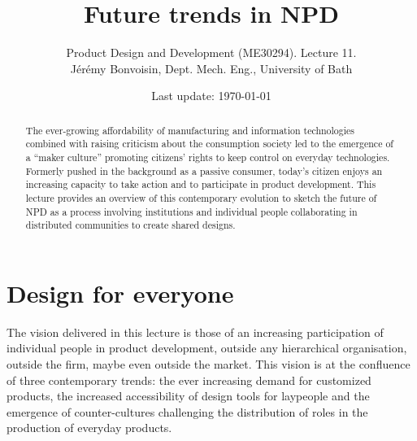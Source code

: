 \documentclass{article}
\begin{document}
\title{Future trends in NPD}

\author{Product Design and Development (ME30294). Lecture 11. \\ Jérémy Bonvoisin, Dept. Mech. Eng., University of Bath}
\date{Last update: \today}

\maketitle

\begin{abstract}
The ever-growing affordability of manufacturing and information technologies combined with raising criticism about the consumption society led to the emergence of a ``maker culture'' promoting citizens' rights to keep control on everyday technologies. Formerly pushed in the background as a passive consumer, today's citizen enjoys an increasing capacity to take action and to participate in product development. This lecture provides an overview of this contemporary evolution to sketch the future of NPD as a process involving institutions and individual people collaborating in distributed communities to create shared designs.
\end{abstract}

\tableofcontents

\section{Design for everyone}
\label{sec:context}
The vision delivered in this lecture is those of an increasing participation of individual people in product development, outside any hierarchical organisation, outside the firm, maybe even outside the market. This vision is at the confluence of three contemporary trends: the ever increasing demand for customized products, the increased accessibility of design tools for laypeople and the emergence of counter-cultures challenging the distribution of roles in the production of everyday products. 
\end{document}
